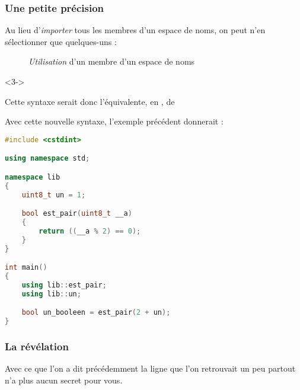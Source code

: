 \documentclass{cppcourses}
\begin{document}
\begin{frame}

\frametitle{Une petite précision}

Au lieu d'\emph{importer} tous les membres d'un espace de noms, on peut n'en sélectionner que quelques-uns :

\begin{figure}
\caption{\emph{Utilisation} d'un membre d'un espace de noms}
\end{figure}

\begin{uncoverenv}<3->

Cette syntaxe serait donc l'équivalente, en , de

\begin{figure}
\end{figure}

\end{uncoverenv}

\end{frame}

\begin{frame}[fragile]

\begin{example}

Avec cette nouvelle syntaxe, l'exemple précédent donnerait :

\begin{lstlisting}[language = c++]
#include <cstdint>

using namespace std;

namespace lib
{
    uint8_t un = 1;

    bool est_pair(uint8_t __a)
    {
        return ((__a % 2) == 0);
    }
}

int main()
{
    using lib::est_pair;
    using lib::un;

    bool un_booleen = est_pair(2 + un);
}
\end{lstlisting}

\end{example}

\end{frame}

\begin{frame}

\frametitle{La révélation}

Avec ce que l'on a dit précédemment la ligne  que l'on retrouvait un peu partout n'a plus aucun secret pour vous.



\end{frame}
\end{document}
